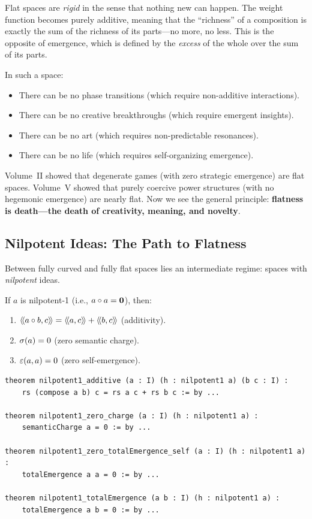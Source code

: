 \begin{interpretation}
Flat spaces are \emph{rigid} in the sense that nothing new can happen. The
weight function becomes purely additive, meaning that the ``richness'' of a
composition is exactly the sum of the richness of its parts---no more, no
less. This is the opposite of emergence, which is defined by the
\emph{excess} of the whole over the sum of its parts.

In such a space:
\begin{itemize}
  \item There can be no phase transitions (which require non-additive interactions).
  \item There can be no creative breakthroughs (which require emergent insights).
  \item There can be no art (which requires non-predictable resonances).
  \item There can be no life (which requires self-organizing emergence).
\end{itemize}

Volume~II showed that degenerate games (with zero strategic emergence) are
flat spaces. Volume~V showed that purely coercive power structures (with no
hegemonic emergence) are nearly flat. Now we see the general principle:
\textbf{flatness is death---the death of creativity, meaning, and novelty}.
\end{interpretation}

\subsection{Nilpotent Ideas: The Path to Flatness}

Between fully curved and fully flat spaces lies an intermediate regime:
spaces with \emph{nilpotent} ideas.

\begin{theorem}
\label{thm:nilpotent-zero-total}
If $a$ is nilpotent-1 (i.e., $a \circ a = \mathbf{0}$), then:
\begin{enumerate}
  \item $\langle\!\langle a \circ b, c \rangle\!\rangle = \langle\!\langle a, c \rangle\!\rangle + \langle\!\langle b, c \rangle\!\rangle$ (additivity).
  \item $\sigma(a) = 0$ (zero semantic charge).
  \item $\varepsilon(a, a) = 0$ (zero self-emergence).
\end{enumerate}
\end{theorem}

\begin{lstlisting}[caption={Nilpotent properties (IDT\_v3\_Emergence.lean)}]
theorem nilpotent1_additive (a : I) (h : nilpotent1 a) (b c : I) :
    rs (compose a b) c = rs a c + rs b c := by ...

theorem nilpotent1_zero_charge (a : I) (h : nilpotent1 a) :
    semanticCharge a = 0 := by ...

theorem nilpotent1_zero_totalEmergence_self (a : I) (h : nilpotent1 a) :
    totalEmergence a a = 0 := by ...

theorem nilpotent1_totalEmergence (a b : I) (h : nilpotent1 a) :
    totalEmergence a b = 0 := by ...
\end{lstlisting}

